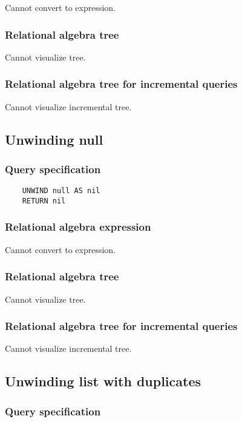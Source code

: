 	Cannot convert to expression.

	\subsubsection*{Relational algebra tree}

	Cannot visualize tree.

	\subsubsection*{Relational algebra tree for incremental queries}

	Cannot visualize incremental tree.
	\subsection{Unwinding null}

	\subsubsection*{Query specification}

	\begin{lstlisting}
	UNWIND null AS nil
	RETURN nil
	\end{lstlisting}


	\subsubsection*{Relational algebra expression}

	Cannot convert to expression.

	\subsubsection*{Relational algebra tree}

	Cannot visualize tree.

	\subsubsection*{Relational algebra tree for incremental queries}

	Cannot visualize incremental tree.
	\subsection{Unwinding list with duplicates}

	\subsubsection*{Query specification}

